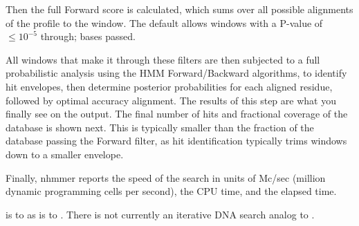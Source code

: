 Then the full Forward score is calculated, which sums over all
possible alignments of the profile to the window. The default allows
windows with a P-value of $\leq 10^{-5}$ through; \NMHnfwd{} bases
passed.

All windows that make it through these filters are then subjected to a
full probabilistic analysis using the HMM Forward/Backward algorithms,
to identify hit envelopes, then determine posterior probabilities for
each aligned residue, followed by optimal accuracy alignment. The
results of this step are what you finally see on the output. The final
number of hits and fractional coverage of the database is shown
next. This is typically smaller than the fraction of the database
passing the Forward filter, as hit identification typically trims
windows down to a smaller envelope.

Finally, nhmmer reports the speed of the search in units of Mc/sec
(million dynamic programming cells per second), the CPU time, and the
elapsed time.

 is to  as  is to
.  There is not currently an iterative DNA search
analog to .







